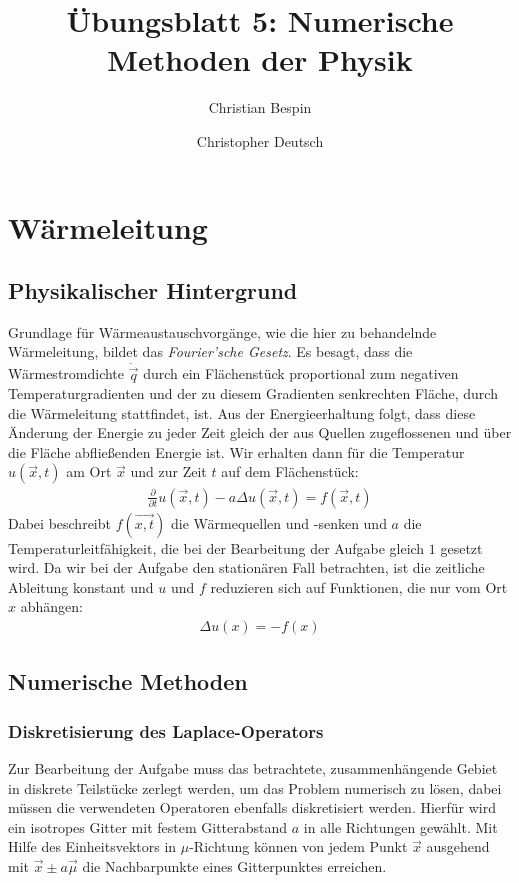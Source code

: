 \documentclass[10pt,a4paper]{article}
\author{Christian Bespin \and Christopher Deutsch}
\title{Übungsblatt 5: Numerische Methoden der Physik}
\begin{document}
\maketitle

\setcounter{section}{4}

\section{Wärmeleitung}

\subsection{Physikalischer Hintergrund}
Grundlage für Wärmeaustauschvorgänge, wie die hier zu behandelnde Wärmeleitung, bildet das \emph{Fourier'sche Gesetz}. Es besagt, dass die Wärmestromdichte $\dot{\vec{q}}$ durch ein Flächenstück proportional zum negativen Temperaturgradienten und der zu diesem Gradienten senkrechten Fläche, durch die Wärmeleitung stattfindet, ist. Aus der Energieerhaltung folgt, dass diese Änderung der Energie zu jeder Zeit gleich der aus Quellen zugeflossenen und über die Fläche abfließenden Energie ist. Wir erhalten dann für die Temperatur $u(\vec{x},t)$ am Ort $\vec{x}$ und zur Zeit $t$ auf dem Flächenstück:
\begin{align}  
\frac{\partial}{\partial t}u(\vec{x},t)-a \Delta u(\vec{x},t)=f(\vec{x},t)
\end{align}
Dabei beschreibt $f(\vec{x,t})$ die Wärmequellen und -senken und $a$ die Temperaturleitfähigkeit, die bei der Bearbeitung der Aufgabe gleich $1$ gesetzt wird. Da wir bei der Aufgabe den stationären Fall betrachten, ist die zeitliche Ableitung konstant und $u$ und $f$ reduzieren sich auf Funktionen, die nur vom Ort $x$ abhängen:
\begin{align}
\Delta u(x)=-f(x)
\label{eqn:dgl}
\end{align}

\subsection{Numerische Methoden}
\subsubsection{Diskretisierung des Laplace-Operators}
Zur Bearbeitung der Aufgabe muss das betrachtete, zusammenhängende Gebiet in diskrete Teilstücke zerlegt werden, um das Problem numerisch zu lösen, dabei müssen die verwendeten Operatoren ebenfalls diskretisiert werden. Hierfür wird ein isotropes Gitter mit festem Gitterabstand $a$ in alle Richtungen gewählt. Mit Hilfe des Einheitsvektors in $\mu$-Richtung können von jedem Punkt $\vec{x}$ ausgehend mit $\vec{x} \pm a\vec{\mu}$ die Nachbarpunkte eines Gitterpunktes erreichen.
\end{document}
